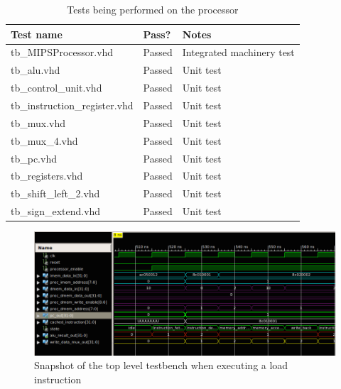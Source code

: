 \begin{table}[ht+]
    \centering
    \begin{tabular}{|l|l|l|}
        \hline
        \textbf{Test name}            & \textbf{Pass?} & \textbf{Notes}            \\ \hline
        tb\_MIPSProcessor.vhd         & Passed         & Integrated machinery test \\ \hline
        tb\_alu.vhd                   & Passed         & Unit test                 \\ \hline
        tb\_control\_unit.vhd         & Passed         & Unit test                 \\ \hline
        tb\_instruction\_register.vhd & Passed         & Unit test                 \\ \hline
        tb\_mux.vhd                   & Passed         & Unit test                 \\ \hline
        tb\_mux\_4.vhd                & Passed         & Unit test                 \\ \hline
        tb\_pc.vhd                    & Passed         & Unit test                 \\ \hline
        tb\_registers.vhd             & Passed         & Unit test                 \\ \hline
        tb\_shift\_left\_2.vhd        & Passed         & Unit test                 \\ \hline
        tb\_sign\_extend.vhd          & Passed         & Unit test                 \\ \hline
    \end{tabular}
    \caption{Tests being performed on the processor}
    \label{tab:tests}
\end{table}

\begin{figure}[ht!]
    \begin{center}
    \includegraphics[width=\textwidth]{assets/isim/memory_read_cycle.png}
    \caption{Snapshot of the top level testbench when executing a load instruction}
    \label{fig:memory_read_cycle}
    \end{center}
\end{figure}

